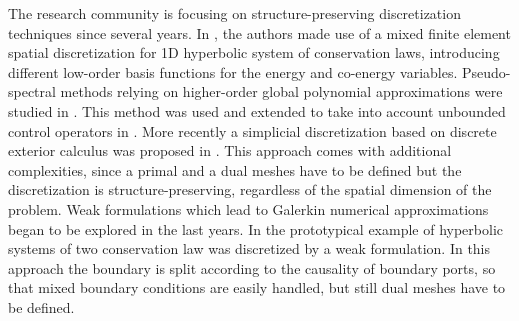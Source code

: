 \documentclass[11t]{article}
\begin{document}
	The research community is focusing on structure-preserving discretization techniques since several years. In \cite{Golo}, the authors made use of a mixed finite element spatial discretization for 1D hyperbolic system of conservation laws, introducing different low-order basis functions for the energy and co-energy variables. Pseudo-spectral methods relying on higher-order global polynomial approximations were studied in \cite{moulla:hal-01625008}. This method was used and extended to take into account unbounded control operators in \cite{articleFlavio}. More recently a simplicial discretization based on discrete exterior calculus was proposed in \cite{SESLIJA20121509}. This approach comes with additional complexities, since a primal and a dual meshes have to be defined but the discretization is structure-preserving, regardless of the spatial dimension of the problem. Weak formulations which lead to Galerkin numerical approximations began to be explored in the last years. In \cite{WeakForm_Kot} the prototypical example of hyperbolic systems of two conservation law was discretized by a weak formulation. In this approach the boundary is split according to the causality of boundary ports, so that mixed boundary conditions are easily handled, but still dual meshes have to be defined.  \\
	
\end{document}
